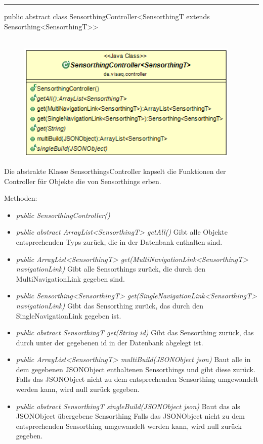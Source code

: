 \rule{\textwidth}{0.4pt}
public abstract class SensorthingController<SensorthingT extends Sensorthing<SensorthingT>>
\\\\
\begin{minipage}{0.4\textwidth}
    \begin{figure}[H]
        {\centering\includegraphics[width=0.95\textwidth]{media/backend/controller/classes/SensorthingsController.png}}
    \end{figure}
    \end{minipage} \hfill
\begin{minipage}{0.6\textwidth}
    Die abstrakte Klasse SensorthingsController kapselt die Funktionen der Controller für Objekte die von Sensorthings erben.
\end{minipage}

Methoden:
\begin{itemize}
    \item \emph{public SensorthingController()}
    \item \emph{public abstract ArrayList<SensorthingT> getAll()}
    Gibt alle Objekte entsprechenden Typs zurück, die in der Datenbank enthalten sind.
    \item \emph{public ArrayList<SensorthingT> get(MultiNavigationLink<SensorthingT> navigationLink)}
    Gibt alle Sensorthings zurück, die durch den MultiNavigationLink gegeben sind.
    \item \emph{public Sensorthing<SensorthingT> get(SingleNavigationLink<SensorthingT> navigationLink)}
    Gibt das Sensorthing zurück, das durch den SingleNavigationLink gegeben ist.
    \item \emph{public abstract SensorthingT get(String id)}
    Gibt das Sensorthing zurück, das durch unter der gegebenen id in der Datenbank abgelegt ist.
    \item \emph{public ArrayList<SensorthingT> multiBuild(JSONObject json)}
    Baut alle in dem gegebenen JSONObject enthaltenen Sensorthings und gibt diese zurück.
    Falls das JSONObject nicht zu dem entsprechenden Sensorthing umgewandelt werden kann, wird null zurück gegeben.
    \item \emph{public abstract SensorthingT singleBuild(JSONObject json)}
    Baut das als JSONObject übergebene Sensorthing
    Falls das JSONObject nicht zu dem entsprechenden Sensorthing umgewandelt werden kann, wird null zurück gegeben.
\end{itemize}

